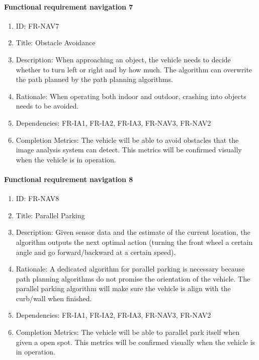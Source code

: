 \documentclass[compsoc,draftclsnofoot,onecolumn,10pt]{IEEEtran}
\begin{document}
	\paragraph{Functional requirement navigation 7}
		\begin{enumerate}
			\item ID: FR-NAV7
			\item Title: Obstacle Avoidance
			\item Description: When approaching an object, the vehicle needs to decide whether to turn left or right and by how much. The algorithm can overwrite the path planned by the path planning algorithms.
			\item Rationale: When operating both indoor and outdoor, crashing into objects needs to be avoided. 
			\item Dependencies: FR-IA1, FR-IA2, FR-IA3, FR-NAV3, FR-NAV2
			\item Completion Metrics: The vehicle will be able to avoid obstacles that the image analysis system can detect. This metrics will be confirmed visually when the vehicle is in operation.  
		\end{enumerate}

	\paragraph{Functional requirement navigation 8}
		\begin{enumerate}
			\item ID: FR-NAV8
			\item Title: Parallel Parking
			\item Description: Given sensor data and the estimate of the current location, the algorithm outputs the next optimal action (turning the front wheel a certain angle and go forward/backward at a certain speed).
			\item Rationale: A dedicated algorithm for parallel parking is necessary because path planning algorithms do not promise the orientation of the vehicle. The parallel parking algorithm will make sure the vehicle is align with the curb/wall when finished.
			\item Dependencies: FR-IA1, FR-IA2, FR-IA3, FR-NAV3, FR-NAV2
			\item Completion Metrics: The vehicle will be able to parallel park itself when given a open spot. This metrics will be confirmed visually when the vehicle is in operation.  
		\end{enumerate}		
		
\end{document}
